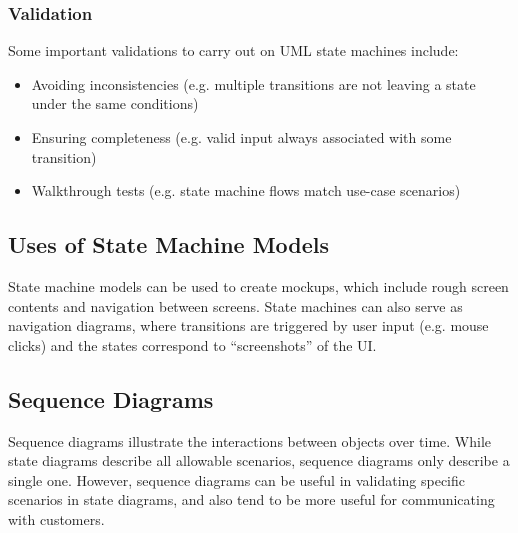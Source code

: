 \documentclass[12pt,titlepage]{article}
\begin{document}
      \subsubsection{Validation}
        Some important validations to carry out on UML state machines include:
        \begin{itemize}
          \item Avoiding inconsistencies (e.g. multiple transitions are not leaving a state under the same conditions)
          \item Ensuring completeness (e.g. valid input always associated with some transition)
          \item Walkthrough tests (e.g. state machine flows match use-case scenarios)
        \end{itemize}

    \subsection{Uses of State Machine Models}
      State machine models can be used to create mockups, which include rough screen contents and navigation between screens. State machines can also
      serve as navigation diagrams, where transitions are triggered by user input (e.g. mouse clicks) and the states correspond to ``screenshots'' of
      the UI.

    \subsection{Sequence Diagrams}
      Sequence diagrams illustrate the interactions between objects over time. While state diagrams describe all allowable scenarios, sequence diagrams
      only describe a single one. However, sequence diagrams can be useful in validating specific scenarios in state diagrams, and also tend to be more
      useful for communicating with customers.
\end{document}
